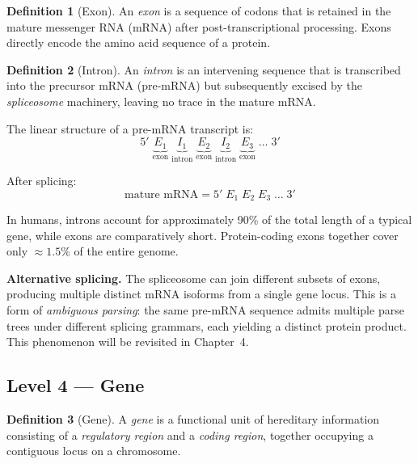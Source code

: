 \documentclass[12pt, a4paper, oneside]{book}
\theoremstyle{definition}
\newtheorem{definition}{Definition}[chapter]
\theoremstyle{remark}
\begin{document}
\begin{definition}[Exon]
An \emph{exon} is a sequence of codons that is retained in the mature
messenger RNA (mRNA) after post-transcriptional processing.
Exons directly encode the amino acid sequence of a protein.
\end{definition}

\begin{definition}[Intron]
An \emph{intron} is an intervening sequence that is transcribed into
the precursor mRNA (pre-mRNA) but subsequently excised by the
\emph{spliceosome} machinery, leaving no trace in the mature mRNA.
\end{definition}

The linear structure of a pre-mRNA transcript is:
\begin{equation}
  5'\;\underbrace{E_1}_{\text{exon}}\;
     \underbrace{I_1}_{\text{intron}}\;
     \underbrace{E_2}_{\text{exon}}\;
     \underbrace{I_2}_{\text{intron}}\;
     \underbrace{E_3}_{\text{exon}}\;\ldots\;3'
\end{equation}

After splicing:
\begin{equation}
  \text{mature mRNA} = 5'\;E_1\;E_2\;E_3\;\ldots\;3'
\end{equation}

\begin{notebox}
In humans, introns account for approximately 90\% of the total length
of a typical gene, while exons are comparatively short.
Protein-coding exons together cover only $\approx 1.5\%$ of the entire genome.
\end{notebox}

\textbf{Alternative splicing.}
The spliceosome can join different subsets of exons, producing multiple
distinct mRNA isoforms from a single gene locus.  This is a form of
\emph{ambiguous parsing}: the same pre-mRNA sequence admits multiple
parse trees under different splicing grammars, each yielding a distinct
protein product.  This phenomenon will be revisited in Chapter~4.

\subsection{Level 4 — Gene}
\label{subsec:gene}

\begin{definition}[Gene]
A \emph{gene} is a functional unit of hereditary information consisting
of a \emph{regulatory region} and a \emph{coding region}, together
occupying a contiguous locus on a chromosome.
\end{definition}
\end{document}
